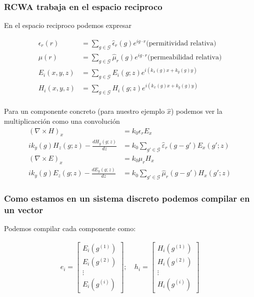 \documentclass[english,9pt]{Linnaeus}
\begin{document}
\begin{frame}[allowframebreaks]
  \frametitle{RCWA trabaja en el espacio reciproco}

  En el espacio reciproco podemos expresar

  \begin{align*}
    \epsilon_r (r) &= \sum_{g \in \mathcal{G}} \hat{\epsilon}_r(g) e^{ig\cdot r} \text{(permitividad relativa)} \\
    \mu (r) &= \sum_{g \in \mathcal{G}} \hat{\mu}_r(g) e^{ig\cdot r} \text{(permeabilidad relativa)} \\
    E_i (x, y, z) &= \sum_{g \in \mathcal{G}} E_i(g; z)e^{i(k_x(g)x + k_y(g)y)}\\
    H_i (x, y, z) &= \sum_{g \in \mathcal{G}} H_i(g; z)e^{i(k_x(g)x + k_y(g)y)}\\
  \end{align*}

  \framebreak

  Para un componente concreto (para nuestro ejemplo $\hat{x}$) podemos ver la multiplicacción como una convolución
  \begin{align*}
    (\nabla \times H)_x &= k_0 \epsilon_r E_x\\
    i k_y (g) H_z (g; z) - \frac{d H_y (g; z)}{d z} &= k_0 \sum_{g' \in \mathcal{G}} \hat{\varepsilon}_r (g - g') E_x (g'; z)\\
    (\nabla \times E)_x &= k_0 \mu_r H_x\\
    i k_y (g) E_z (g; z) - \frac{d E_y (g; z)}{d z} &= k_0 \sum_{g' \in \mathcal{G}} \hat{\mu}_r (g - g') H_x (g'; z)
  \end{align*}
\end{frame}

\begin{frame}[allowframebreaks]
  \frametitle{Como estamos en un sistema discreto podemos compilar en un vector}

  Podemos compilar cada componente como:

  \begin{align*}
    e_i = \begin{bmatrix}E_i(g^{(1)})\\ E_i(g^{(2)})\\ \vdots\\ E_i(g^{(i)})\end{bmatrix};&\ 
      h_i = \begin{bmatrix}H_i(g^{(1)})\\ H_i(g^{(2)})\\ \vdots\\ H_i(g^{(i)})\end{bmatrix}
  \end{align*}

\end{frame}
\end{document}
